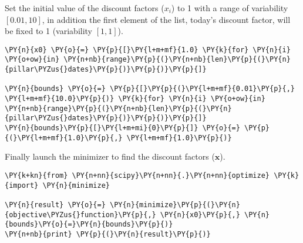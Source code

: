 \begin{Answer}
Set the initial value of the discount factors (\(x_i\)) to 1 with a
  range of variability \([ 0.01, 10]\), in addition the first element of
  the list, today's discount factor, will be fixed to 1 (variability
  \([1, 1]\)).

\begin{tcolorbox}[breakable, size=fbox, boxrule=1pt, pad at break*=1mm,colback=cellbackground, colframe=cellborder]
\begin{Verbatim}[commandchars=\\\{\}]
\PY{n}{x0} \PY{o}{=} \PY{p}{[}\PY{l+m+mf}{1.0} \PY{k}{for} \PY{n}{i} \PY{o+ow}{in} \PY{n+nb}{range}\PY{p}{(}\PY{n+nb}{len}\PY{p}{(}\PY{n}{pillar\PYZus{}dates}\PY{p}{)}\PY{p}{)}\PY{p}{]}

\PY{n}{bounds} \PY{o}{=} \PY{p}{[}\PY{p}{(}\PY{l+m+mf}{0.01}\PY{p}{,} \PY{l+m+mf}{10.0}\PY{p}{)} \PY{k}{for} \PY{n}{i} \PY{o+ow}{in} \PY{n+nb}{range}\PY{p}{(}\PY{n+nb}{len}\PY{p}{(}\PY{n}{pillar\PYZus{}dates}\PY{p}{)}\PY{p}{)}\PY{p}{]}
\PY{n}{bounds}\PY{p}{[}\PY{l+m+mi}{0}\PY{p}{]} \PY{o}{=} \PY{p}{(}\PY{l+m+mf}{1.0}\PY{p}{,} \PY{l+m+mf}{1.0}\PY{p}{)}
\end{Verbatim}
\end{tcolorbox}

Finally launch the minimizer to find the discount factors (\(\mathbf{x}\)).

\begin{tcolorbox}[breakable, size=fbox, boxrule=1pt, pad at break*=1mm,colback=cellbackground, colframe=cellborder]
\begin{Verbatim}[commandchars=\\\{\}]
\PY{k+kn}{from} \PY{n+nn}{scipy}\PY{n+nn}{.}\PY{n+nn}{optimize} \PY{k}{import} \PY{n}{minimize}

\PY{n}{result} \PY{o}{=} \PY{n}{minimize}\PY{p}{(}\PY{n}{objective\PYZus{}function}\PY{p}{,} \PY{n}{x0}\PY{p}{,} \PY{n}{bounds}\PY{o}{=}\PY{n}{bounds}\PY{p}{)}
\PY{n+nb}{print} \PY{p}{(}\PY{n}{result}\PY{p}{)}


\end{Verbatim}
\end{tcolorbox}
\end{Answer}
